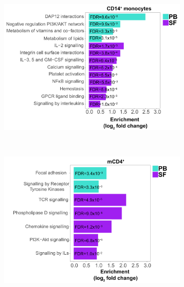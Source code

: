 \begin{figure}[H]
\centering
\begin{subfigure}[b]{0.48\textwidth}
\centering 
\includegraphics[width=\textwidth]{./Results3/pdfs/ATAC_PSA_CD14_pathways_barplot_all_DOCS_proximity_FC}
\caption{}
\end{subfigure}
~
\begin{subfigure}[b]{0.48\textwidth}
\centering 
\includegraphics[width=\textwidth]{./Results3/pdfs/ATAC_PSA_CD4_pathways_barplot_all_DOCS_proximity_FC}
\caption{}
\end{subfigure}
~
\begin{subfigure}[b]{0.48\textwidth} 
\centering

\end{subfigure}
\end{figure}
